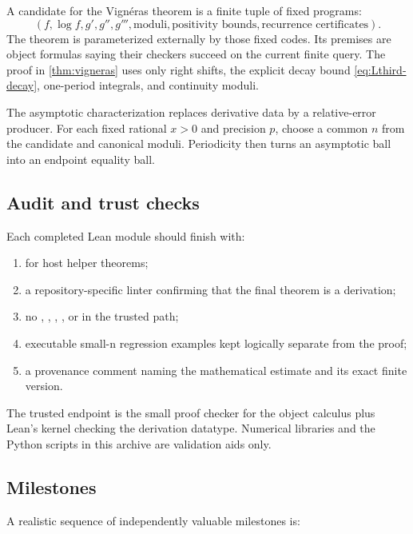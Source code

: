 A candidate for the Vign\'eras theorem is a finite tuple of fixed programs:
\[
 (f,\log f,g',g'',g''',\text{moduli},\text{positivity bounds},
   \text{recurrence certificates}).
\]
The theorem is parameterized externally by those fixed codes.  Its premises
are object formulas saying their checkers succeed on the current finite query.
The proof in \cref{thm:vigneras} uses only right shifts, the explicit decay
bound \cref{eq:Lthird-decay}, one-period integrals, and continuity moduli.

The asymptotic characterization replaces derivative data by a relative-error
producer.  For each fixed rational \(x>0\) and precision \(p\), choose a common
\(n\) from the candidate and canonical moduli.  Periodicity then turns an
asymptotic ball into an endpoint equality ball.

\subsection{Audit and trust checks}

Each completed Lean module should finish with:
\begin{enumerate}
\item {} for host helper theorems;
\item a repository-specific linter confirming that the final theorem is a
 derivation;
\item no , , , , or
 in the trusted path;
\item executable small-n regression examples kept logically separate from the
proof;
\item a provenance comment naming the mathematical estimate and its exact
finite version.
\end{enumerate}

The trusted endpoint is the small proof checker for the object calculus plus
Lean's kernel checking the derivation datatype.  Numerical libraries and the
Python scripts in this archive are validation aids only.

\subsection{Milestones}

A realistic sequence of independently valuable milestones is:

